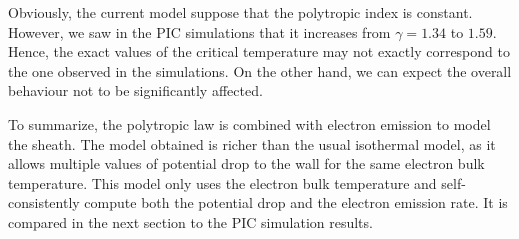 Obviously, the current model suppose that the polytropic index is constant.
However, we saw in the \ac{PIC} simulations that it increases from $\gamma = 1.34$ to $1.59$.
Hence, the exact values of the critical temperature may not exactly correspond to the one observed in the simulations.
On the other hand, we can expect the overall behaviour not to be significantly affected.

\vspace{1em}
To summarize, the polytropic law is combined with electron emission to model the sheath.
The model obtained is richer than the usual isothermal model, as it allows multiple values of potential drop to the wall for the same electron bulk temperature.
This model only uses the electron bulk temperature and self-consistently compute both the potential drop and the electron emission rate.
It is compared in the next section to the \ac{PIC} simulation results.
